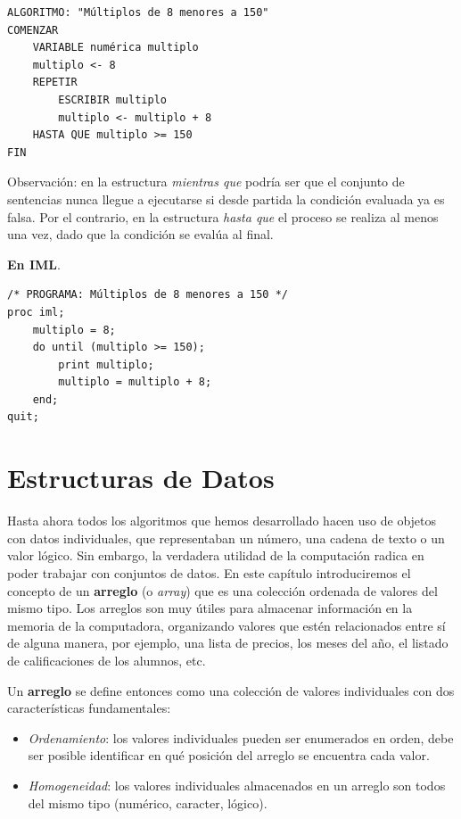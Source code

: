 \documentclass[]{book}
\providecommand{\tightlist}{%
  \setlength{\itemsep}{0pt}\setlength{\parskip}{0pt}}
\begin{document}
\begin{verbatim}
ALGORITMO: "Múltiplos de 8 menores a 150"
COMENZAR
    VARIABLE numérica multiplo
    multiplo <- 8
    REPETIR
        ESCRIBIR multiplo
        multiplo <- multiplo + 8
    HASTA QUE multiplo >= 150
FIN
\end{verbatim}

Observación: en la estructura \emph{mientras que} podría ser que el conjunto de sentencias nunca llegue a ejecutarse si desde partida la condición evaluada ya es falsa. Por el contrario, en la estructura \emph{hasta que} el proceso se realiza al menos una vez, dado que la condición se evalúa al final.

\textbf{En IML}.

\begin{verbatim}
/* PROGRAMA: Múltiplos de 8 menores a 150 */
proc iml;
    multiplo = 8;
    do until (multiplo >= 150);
        print multiplo;
        multiplo = multiplo + 8;
    end;
quit;
\end{verbatim}

\hypertarget{estructuras-de-datos}{%
\chapter{Estructuras de Datos}\label{estructuras-de-datos}}

Hasta ahora todos los algoritmos que hemos desarrollado hacen uso de objetos con datos individuales, que representaban un número, una cadena de texto o un valor lógico. Sin embargo, la verdadera utilidad de la computación radica en poder trabajar con conjuntos de datos. En este capítulo introduciremos el concepto de un \textbf{arreglo} (o \emph{array}) que es una colección ordenada de valores del mismo tipo. Los arreglos son muy útiles para almacenar información en la memoria de la computadora, organizando valores que estén relacionados entre sí de alguna manera, por ejemplo, una lista de precios, los meses del año, el listado de calificaciones de los alumnos, etc.

Un \textbf{arreglo} se define entonces como una colección de valores individuales con dos características fundamentales:

\begin{itemize}
\tightlist
\item
  \emph{Ordenamiento}: los valores individuales pueden ser enumerados en orden, debe ser posible identificar en qué posición del arreglo se encuentra cada valor.
\item
  \emph{Homogeneidad}: los valores individuales almacenados en un arreglo son todos del mismo tipo (numérico, caracter, lógico).
\end{itemize}
\end{document}
